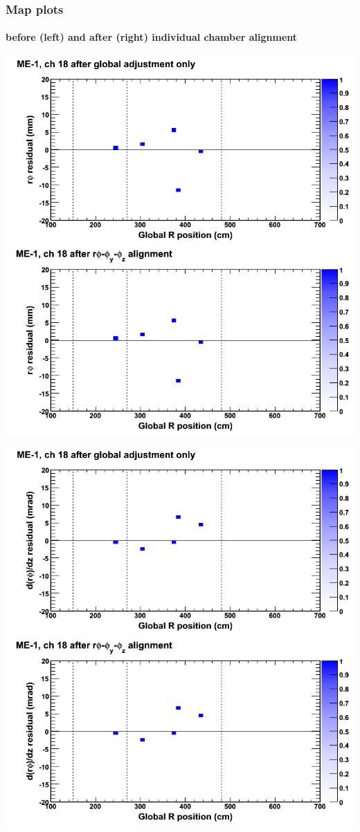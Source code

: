 \documentclass[compress]{beamer}
\begin{document}
\begin{frame}
\frametitle{Map plots}
\framesubtitle{before (left) and after (right) individual chamber alignment}
\includegraphics[width=0.5\linewidth]{ringmapplots_3dof/before_CSCvsr_mem1ch18_x.png} \includegraphics[width=0.5\linewidth]{ringmapplots_3dof/after_CSCvsr_mem1ch18_x.png}

\includegraphics[width=0.5\linewidth]{ringmapplots_3dof/before_CSCvsr_mem1ch18_dxdz.png} \includegraphics[width=0.5\linewidth]{ringmapplots_3dof/after_CSCvsr_mem1ch18_dxdz.png}
\end{frame}
\end{document}
